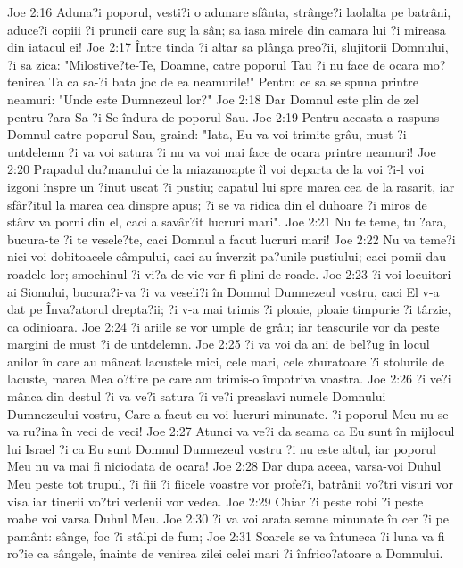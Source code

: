 Joe 2:16  Aduna?i poporul, vesti?i o adunare sfânta, strânge?i laolalta pe batrâni, aduce?i copiii ?i pruncii care sug la sân; sa iasa mirele din camara lui ?i mireasa din iatacul ei!
Joe 2:17  Între tinda ?i altar sa plânga preo?ii, slujitorii Domnului, ?i sa zica: "Milostive?te-Te, Doamne, catre poporul Tau ?i nu face de ocara mo?tenirea Ta ca sa-?i bata joc de ea neamurile!" Pentru ce sa se spuna printre neamuri: "Unde este Dumnezeul lor?"
Joe 2:18  Dar Domnul este plin de zel pentru ?ara Sa ?i Se îndura de poporul Sau.
Joe 2:19  Pentru aceasta a raspuns Domnul catre poporul Sau, graind: "Iata, Eu va voi trimite grâu, must ?i untdelemn ?i va voi satura ?i nu va voi mai face de ocara printre neamuri!
Joe 2:20  Prapadul du?manului de la miazanoapte îl voi departa de la voi ?i-l voi izgoni înspre un ?inut uscat ?i pustiu; capatul lui spre marea cea de la rasarit, iar sfâr?itul la marea cea dinspre apus; ?i se va ridica din el duhoare ?i miros de stârv va porni din el, caci a savâr?it lucruri mari".
Joe 2:21  Nu te teme, tu ?ara, bucura-te ?i te vesele?te, caci Domnul a facut lucruri mari!
Joe 2:22  Nu va teme?i nici voi dobitoacele câmpului, caci au înverzit pa?unile pustiului; caci pomii dau roadele lor; smochinul ?i vi?a de vie vor fi plini de roade.
Joe 2:23  ?i voi locuitori ai Sionului, bucura?i-va ?i va veseli?i în Domnul Dumnezeul vostru, caci El v-a dat pe Înva?atorul drepta?ii; ?i v-a mai trimis ?i ploaie, ploaie timpurie ?i târzie, ca odinioara.
Joe 2:24  ?i ariile se vor umple de grâu; iar teascurile vor da peste margini de must ?i de untdelemn.
Joe 2:25  ?i va voi da ani de bel?ug în locul anilor în care au mâncat lacustele mici, cele mari, cele zburatoare ?i stolurile de lacuste, marea Mea o?tire pe care am trimis-o împotriva voastra.
Joe 2:26  ?i ve?i mânca din destul ?i va ve?i satura ?i ve?i preaslavi numele Domnului Dumnezeului vostru, Care a facut cu voi lucruri minunate. ?i poporul Meu nu se va ru?ina în veci de veci!
Joe 2:27  Atunci va ve?i da seama ca Eu sunt în mijlocul lui Israel ?i ca Eu sunt Domnul Dumnezeul vostru ?i nu este altul, iar poporul Meu nu va mai fi niciodata de ocara!
Joe 2:28  Dar dupa aceea, varsa-voi Duhul Meu peste tot trupul, ?i fiii ?i fiicele voastre vor profe?i, batrânii vo?tri visuri vor visa iar tinerii vo?tri vedenii vor vedea.
Joe 2:29  Chiar ?i peste robi ?i peste roabe voi varsa Duhul Meu.
Joe 2:30  ?i va voi arata semne minunate în cer ?i pe pamânt: sânge, foc ?i stâlpi de fum;
Joe 2:31  Soarele se va întuneca ?i luna va fi ro?ie ca sângele, înainte de venirea zilei celei mari ?i înfrico?atoare a Domnului.
